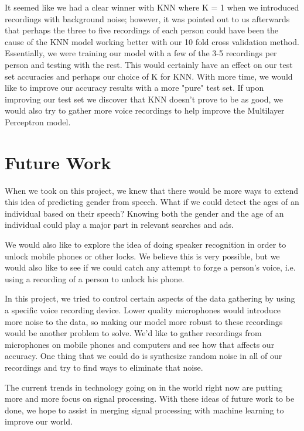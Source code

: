 \documentclass{article}
\begin{document}
It seemed like we had a clear winner with KNN where K = 1 when we introduced recordings with background noise; however, it was pointed out to us afterwards that perhaps the three to five recordings of each person could have been the cause of the KNN model working better with our 10 fold cross validation method. Essentially, we were training our model with a few of the 3-5 recordings per person and testing with the rest. This would certainly have an effect on our test set accuracies and perhaps our choice of K for KNN. With more time, we would like to improve our accuracy results with a more "pure" test set. If upon improving our test set we discover that KNN doesn't prove to be as good, we would also try to gather more voice recordings to help improve the Multilayer Perceptron model.

\section{Future Work}

When we took on this project, we knew that there would be more ways to extend this idea of predicting gender from speech. What if we could detect the ages of an individual based on their speech? Knowing both the gender and the age of an individual could play a major part in relevant searches and ads.

We would also like to explore the idea of doing speaker recognition in order to unlock mobile phones or other locks. We believe this is very possible, but we would also like to see if we could catch any attempt to forge a person's voice, i.e. using a recording of a person to unlock his phone.

In this project, we tried to control certain aspects of the data gathering by using a specific voice recording device. Lower quality microphones would introduce more noise to the data, so making our model more robust to these recordings would be another problem to solve. We'd like to gather recordings from microphones on mobile phones and computers and see how that affects our accuracy. One thing that we could do is synthesize random noise in all of our recordings and try to find ways to eliminate that noise.

The current trends in technology going on in the world right now are putting more and more focus on signal processing. With these ideas of future work to be done, we hope to assist in merging signal processing with machine learning to improve our world.

\appendix




\end{document}
